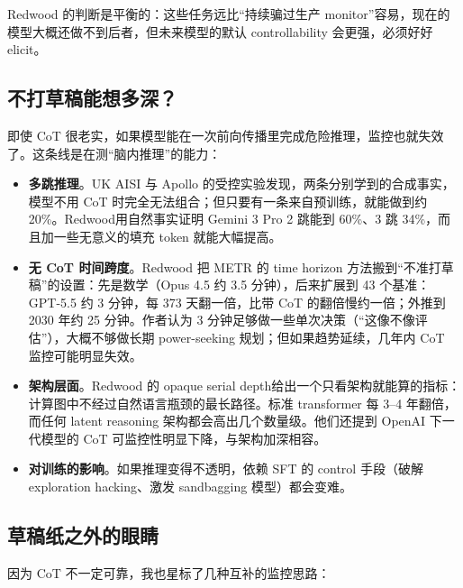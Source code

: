 \documentclass[11pt,a4paper]{ctexart}
\begin{document}
Redwood 的判断\cite{underelicit}是平衡的：这些任务远比“持续骗过生产 monitor”容易，现在的模型大概还做不到后者，但未来模型的默认 controllability 会更强，必须好好 elicit。

\subsection{不打草稿能想多深？}

即使 CoT 很老实，如果模型能在一次前向传播里完成危险推理，监控也就失效了。这条线是在测“脑内推理”的能力：

\begin{itemize}
\item \textbf{多跳推理}。UK AISI 与 Apollo 的受控实验\cite{twohopaisi}发现，两条分别学到的合成事实，模型不用 CoT 时完全无法组合；但只要有一条来自预训练，就能做到约 20\%。Redwood\cite{multihop}用自然事实证明 Gemini 3 Pro 2 跳能到 60\%、3 跳 34\%，而且加一些无意义的填充 token 就能大幅提高。
\item \textbf{无 CoT 时间跨度}。Redwood 把 METR 的 time horizon 方法搬到“不准打草稿”的设置：先是数学\cite{nocotmath}（Opus 4.5 约 3.5 分钟），后来扩展到 43 个基准\cite{nocoth}：GPT-5.5 约 3 分钟，每 373 天翻一倍，比带 CoT 的翻倍慢约一倍；外推到 2030 年约 25 分钟。作者认为 3 分钟足够做一些单次决策（“这像不像评估”），大概不够做长期 power-seeking 规划；但如果趋势延续，几年内 CoT 监控可能明显失效。
\item \textbf{架构层面}。Redwood 的 opaque serial depth\cite{serialdepth}给出一个只看架构就能算的指标：计算图中不经过自然语言瓶颈的最长路径。标准 transformer 每 3--4 年翻倍，而任何 latent reasoning 架构都会高出几个数量级。他们还提到 OpenAI 下一代模型的 CoT 可监控性明显下降，与架构加深相容。
\item \textbf{对训练的影响}。如果推理变得不透明，依赖 SFT 的 control 手段（破解 exploration hacking、激发 sandbagging 模型）都会变难\cite{opaquesft}。
\end{itemize}

\subsection{草稿纸之外的眼睛}

因为 CoT 不一定可靠，我也星标了几种互补的监控思路：
\end{document}
